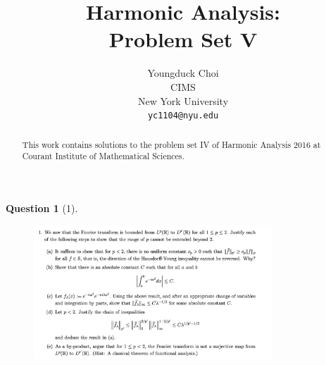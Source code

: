 \documentclass{article} %
\title{Harmonic Analysis:  \\
Problem Set V}
\author{
Youngduck Choi \\
CIMS \\
New York University\\
\texttt{yc1104@nyu.edu} \\
}
\theoremstyle{quest}
\newtheorem*{question}{Question}
\begin{document}
\maketitle

\begin{abstract}
This work contains solutions to the problem set IV
of Harmonic Analysis 2016 at Courant Institute of Mathematical Sciences.
\end{abstract}

\bigskip

\begin{question}[1]
\hfill
\begin{figure}[h!]
  \centering
    \includegraphics[width=0.8\textwidth]{HA-5-1.png}
\end{figure}
\end{question}
\end{document}
